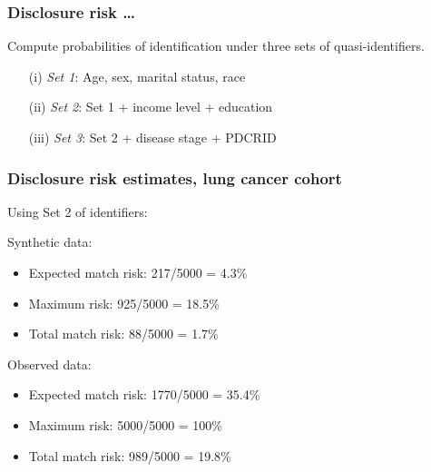 \documentclass[11pt,handout]{beamer}
\begin{document}
\begin{frame}
\frametitle{Disclosure risk \ldots}

Compute probabilities of identification under three sets of quasi-identifiers.

\vspace{0.1in}

\begin{itemize}
\item[(i)] \textit{Set 1}:  Age, sex, marital status, race

\medskip

\item[(ii)] \textit{Set 2}:  \textcolor{forest}{Set 1 + income level + education}

\medskip

\item[(iii)] \textit{Set 3}: Set 2 + disease stage +  PDCRID

\end{itemize}
 
\end{frame}

\begin{frame}
\frametitle{Disclosure risk estimates, lung cancer cohort}

Using Set 2 of identifiers:

Synthetic data:

\begin{itemize}

  \item Expected match risk: 217/5000 = 4.3\%
  
  \item Maximum risk: 925/5000 = 18.5\%
  
  \item Total match risk: 88/5000 = 1.7\%

\end{itemize}

Observed data:

\begin{itemize}

  \item Expected match risk: 1770/5000 = 35.4\%
  
  \item Maximum risk: 5000/5000 = 100\%
  
  \item Total match risk: 989/5000 = 19.8\%

\end{itemize}

\end{frame}
\end{document}
